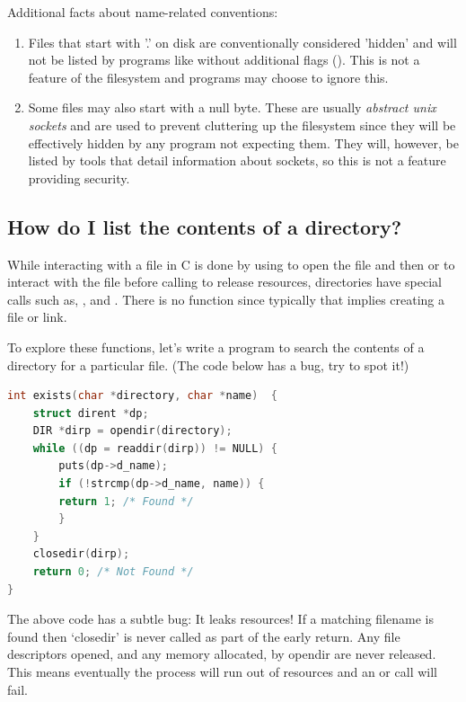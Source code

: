 Additional facts about name-related conventions:
\begin{enumerate}
  \item Files that start with '.' on disk are conventionally considered 'hidden' and will not be listed by programs like  without additional flags (). This is not a feature of the filesystem and programs may choose to ignore this.
  \item Some files may also start with a null byte. These are usually \emph{abstract unix sockets} and are used to prevent cluttering up the filesystem since they will be effectively hidden by any program not expecting them. They will, however, be listed by tools that detail information about sockets, so this is not a feature providing security.
\end{enumerate}

\subsection{How do I list the contents of a directory?}

While interacting with a file in C is done by using  to open the file and then  or  to interact with the file before calling  to release resources, directories have special calls such as, ,  and . There is no function  since typically that implies creating a file or link.

To explore these functions, let's write a program to search the contents of a directory for a particular file. (The code below has a bug, try to spot it!)

\begin{lstlisting}[language=C]
int exists(char *directory, char *name)  {
    struct dirent *dp;
    DIR *dirp = opendir(directory);
    while ((dp = readdir(dirp)) != NULL) {
        puts(dp->d_name);
        if (!strcmp(dp->d_name, name)) {
        return 1; /* Found */
        }
    }
    closedir(dirp);
    return 0; /* Not Found */
}
\end{lstlisting}

The above code has a subtle bug: It leaks resources! If a matching filename is found then `closedir' is never called as part of the early return. Any file descriptors opened, and any memory allocated, by opendir are never released. This means eventually the process will run out of resources and an  or  call will fail.

